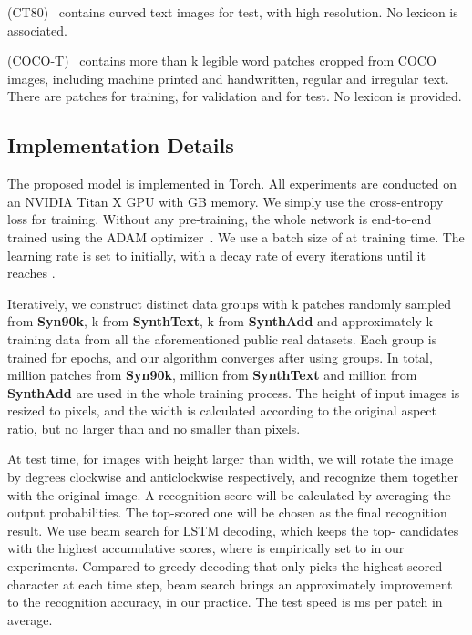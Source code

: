 \documentclass[letterpaper]{article} \usepackage{aaai19}  \usepackage{times}  \usepackage{helvet}  \usepackage{courier}  \usepackage{url}  \usepackage{graphicx}  \usepackage{amsmath}
\begin{document}
 (CT80)~\cite{CT80}
contains  curved text images for test, with high resolution. No lexicon is associated.

 (COCO-T)~\cite{cocotext}
contains more than k legible word patches cropped from COCO images, including machine printed and handwritten, regular and irregular text.
There are  patches for training,  for validation and  for test. No lexicon is provided.

\subsection{Implementation Details}
The proposed model is implemented in Torch. All experiments are conducted on an NVIDIA Titan X GPU with GB memory.
We simply use the cross-entropy loss for training. Without any pre-training, the whole network is end-to-end trained using the ADAM optimizer~\cite{adam14}.
We use a batch size of  at training time. The learning rate is set to  initially, with a decay rate of  every  iterations until it reaches .

Iteratively, we construct distinct data groups with k patches randomly sampled from \textbf{Syn90k}, k from \textbf{SynthText}, k from \textbf{SynthAdd}
and approximately k training data from all the aforementioned public real datasets.
Each group is trained for  epochs, and our algorithm converges after using  groups.
In total,  million patches from \textbf{Syn90k},  million from \textbf{SynthText} and  million from \textbf{SynthAdd} are used in the whole training process.
The height of input images is resized to  pixels, and the width is calculated according to the original aspect ratio, but no larger than  and no smaller than  pixels.


At test time, for images with height larger than width, we will rotate the image by  degrees clockwise and anticlockwise respectively, and recognize them together with the original image.
A recognition score will be calculated by averaging the output probabilities. The top-scored one will be chosen as the final recognition result.
We use beam search for LSTM decoding, which keeps the top- candidates with the highest accumulative scores, where  is empirically set to  in our experiments.
Compared to greedy decoding that only picks the highest scored character at each time step,
beam search brings an approximately  improvement to the recognition accuracy, in our practice.
The test speed is ms per patch in average.
\end{document}

